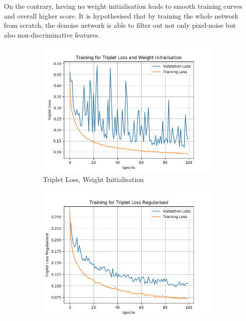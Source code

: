 \documentclass[10pt,twocolumn,letterpaper]{article}
\begin{document}
On the contrary, having no weight initialisation leads to smooth training curves and overall higher score. It is hypothesised that by training the whole network from scratch, the denoise network is able to filter out not only pixel-noise but also non-discriminative features.

\begin{figure}[H]
     \centering
     \begin{subfigure}[b]{0.35\textwidth}
         \centering
         \includegraphics[width=\textwidth]{report/figures/loss_0.png}
         \caption{Triplet Loss, Weight Initialisation}
         \label{fig:triplet_loss_weight_init}
     \end{subfigure}
     \begin{subfigure}[b]{0.35\textwidth}
         \centering
         \includegraphics[width=\textwidth]{report/figures/loss_2.png}

\end{subfigure}
\end{figure}
\end{document}
